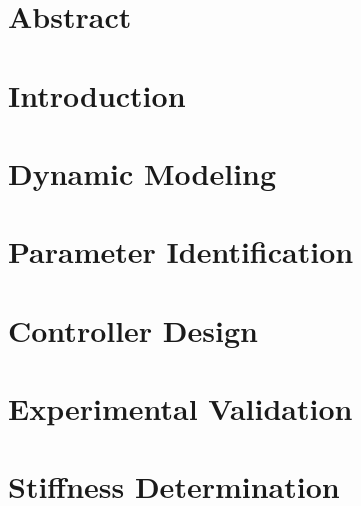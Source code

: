 \documentclass[12pt,twoside]{report}
\begin{document}

\thispagestyle{empty}



\chapter*{Abstract}

\cleardoublepage

\tableofcontents

\cleardoublepage

\cleardoublepage






%

\chapter{Introduction}

\cleardoublepage

\chapter{Dynamic Modeling}

\cleardoublepage

\chapter{Parameter Identification}

\cleardoublepage


\chapter{Controller Design}

\cleardoublepage


\chapter{Experimental Validation}





%




\newpage


\cleardoublepage

\appendix
\chapter{Stiffness Determination}

\end{document}
